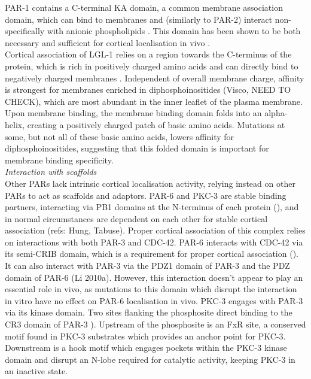 \documentclass[12pt]{"article"}
\begin{document}
PAR-1 contains a C-terminal KA domain, a common membrane association domain, which can bind to membranes and (similarly to PAR-2) interact non-specifically with anionic phospholipids \parencite{Moravcevic2010}. This domain has been shown to be both necessary and sufficient for cortical localisation in vivo \parencite{Motegi2011}.\\

Cortical association of LGL-1 relies on a region towards the C-terminus of the protein, which is rich in positively charged amino acids and can directly bind to negatively charged membranes \parencite{Visco2016}. Independent of overall membrane charge, affinity is strongest for membranes enriched in diphosphoinositides (Visco, NEED TO CHECK), which are most abundant in the inner leaflet of the plasma membrane. Upon membrane binding, the membrane binding domain folds into an alpha-helix, creating a positively charged patch of basic amino acids. Mutations at some, but not all of these basic amino acids, lowers affinity for diphosphoinositides, suggesting that this folded domain is important for membrane binding specificity. \\


\textit{Interaction with scaffolds}\\

Other PARs lack intrinsic cortical localisation activity, relying instead on other PARs to act as scaffolds and adaptors. PAR-6 and PKC-3 are stable binding partners, interacting via PB1 domains at the N-terminus of each protein (\cite{Hirano2005}), and in normal circumstances are dependent on each other for stable cortical association (refs: Hung, Tabuse). Proper cortical association of this complex relies on interactions with both PAR-3 and CDC-42. PAR-6 interacts with CDC-42 via its semi-CRIB domain, which is a requirement for proper cortical association (\cite{Aceto2006}). It can also interact with PAR-3 via the PDZ1 domain of PAR-3 and the PDZ domain of PAR-6 (Li 2010a). However, this interaction doesn’t appear to play an essential role in vivo, as mutations to this domain which disrupt the interaction in vitro have no effect on PAR-6 localisation in vivo. PKC-3 engages with PAR-3 via its kinase domain. Two sites flanking the phosphosite direct binding to the CR3 domain of PAR-3 \citep{Soriano2016}). Upstream of the phosphosite is an FxR site, a conserved motif found in PKC-3 substrates which provides an anchor point for PKC-3. Downstream is a hook motif which engages pockets within the PKC-3 kinase domain and disrupt an N-lobe required for catalytic activity, keeping PKC-3 in an inactive state.\\
\end{document}
